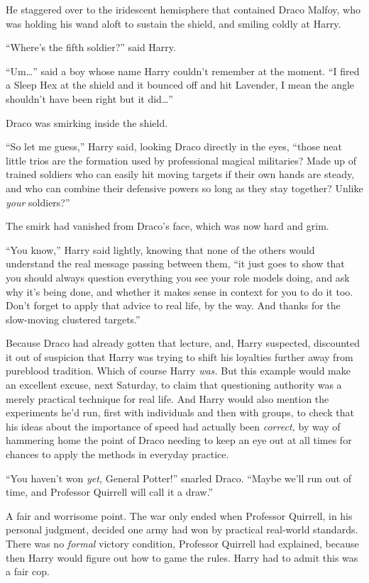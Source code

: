 He staggered over to the iridescent hemisphere that contained Draco
Malfoy, who was holding his wand aloft to sustain the shield, and
smiling coldly at Harry.

``Where's the fifth soldier?'' said Harry.

``Um\ldots{}'' said a boy whose name Harry couldn't remember at the
moment. ``I fired a Sleep Hex at the shield and it bounced off and hit
Lavender, I mean the angle shouldn't have been right but it
did\ldots{}''

Draco was smirking inside the shield.

``So let me guess,'' Harry said, looking Draco directly in the eyes,
``those neat little trios are the formation used by professional magical
militaries? Made up of trained soldiers who can easily hit moving
targets if their own hands are steady, and who can combine their
defensive powers so long as they stay together? Unlike \emph{your}
soldiers?''

The smirk had vanished from Draco's face, which was now hard and grim.

``You know,'' Harry said lightly, knowing that none of the others would
understand the real message passing between them, ``it just goes to show
that you should always question everything you see your role models
doing, and ask why it's being done, and whether it makes sense in
context for you to do it too. Don't forget to apply that advice to real
life, by the way. And thanks for the slow-moving clustered targets.''

Because Draco had already gotten that lecture, and, Harry suspected,
discounted it out of suspicion that Harry was trying to shift his
loyalties further away from pureblood tradition. Which of course Harry
\emph{was.} But this example would make an excellent excuse, next
Saturday, to claim that questioning authority was a merely practical
technique for real life. And Harry would also mention the experiments
he'd run, first with individuals and then with groups, to check that his
ideas about the importance of speed had actually been \emph{correct,} by
way of hammering home the point of Draco needing to keep an eye out at
all times for chances to apply the methods in everyday practice.

``You haven't won \emph{yet,} General Potter!'' snarled Draco. ``Maybe
we'll run out of time, and Professor Quirrell will call it a draw.''

A fair and worrisome point. The war only ended when Professor Quirrell,
in his personal judgment, decided one army had won by practical
real-world standards. There was no \emph{formal} victory condition,
Professor Quirrell had explained, because then Harry would figure out
how to game the rules. Harry had to admit this was a fair cop.

